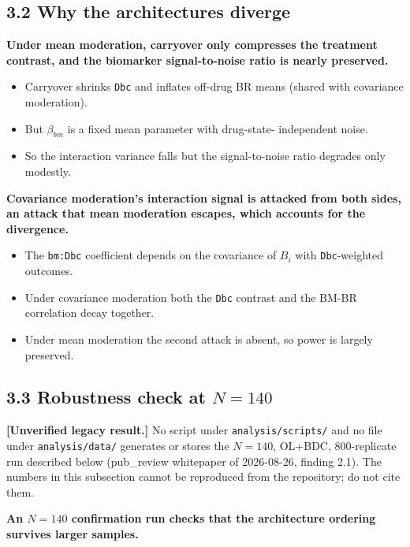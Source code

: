 \documentclass[
  11pt,
]{article}
\begin{document}
\subsection{3.2 Why the architectures diverge}

\textbf{Under mean moderation, carryover only compresses the
treatment contrast, and the biomarker signal-to-noise ratio is
nearly preserved.}

\begin{itemize}\setlength{\itemsep}{2pt}\setlength{\parskip}{0pt}
\item Carryover shrinks \texttt{Dbc} and inflates off-drug BR means
(shared with covariance moderation).
\item But $\beta_{bm}$ is a fixed mean parameter with drug-state-
independent noise.
\item So the interaction variance falls but the signal-to-noise
ratio degrades only modestly.
\end{itemize}

\textbf{Covariance moderation's interaction signal is attacked from both
sides, an attack that mean moderation escapes, which accounts for the
divergence.}

\begin{itemize}\setlength{\itemsep}{2pt}\setlength{\parskip}{0pt}
\item The \texttt{bm:Dbc} coefficient depends on the covariance of
$B_i$ with \texttt{Dbc}-weighted outcomes.
\item Under covariance moderation both the \texttt{Dbc} contrast and
the BM-BR correlation decay together.
\item Under mean moderation the second attack is absent, so power is
largely preserved.
\end{itemize}

\subsection{3.3 Robustness check at $N = 140$}

\textbf{[Unverified legacy result.]} No script under
\texttt{analysis/scripts/} and no file under \texttt{analysis/data/}
generates or stores the \(N = 140\), OL+BDC, 800-replicate run
described below (pub\_review whitepaper of 2026-08-26, finding 2.1).
The numbers in this subsection cannot be reproduced from the
repository; do not cite them.

\textbf{An $N = 140$ confirmation run checks that the architecture
ordering survives larger samples.}
\end{document}
